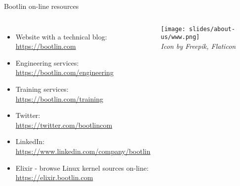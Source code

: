 \begin{frame}{Bootlin on-line resources}
  \begin{columns}[T]
    \begin{itemize}
    \item Website with a technical blog:\\
      \url{https://bootlin.com}
    \item Engineering services:\\
      \url{https://bootlin.com/engineering}
    \item Training services:\\
      \url{https://bootlin.com/training}
    \item Twitter:\\
      \url{https://twitter.com/bootlincom}
    \item LinkedIn:\\
      \url{https://www.linkedin.com/company/bootlin}
    \item Elixir - browse Linux kernel sources on-line:\\
      \url{https://elixir.bootlin.com}
    \end{itemize}
    \begin{center}
      \texttt{[image: slides/about-us/www.png]}\\
      {\tiny {\em Icon by Freepik, Flaticon}}
    \end{center}
  \end{columns}
\end{frame}
